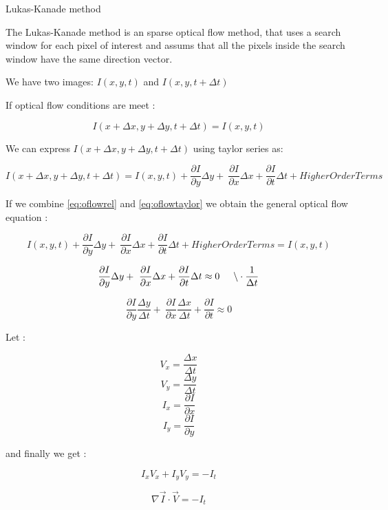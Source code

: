 Lukas-Kanade method

The Lukas-Kanade method is an sparse optical flow method, that 
uses a search window for each pixel of interest and assums that all the pixels 
inside the search window have the same direction vector.


We have two images: $I(x,y,t)$ and $I(x,y,t+\Delta t)$ 

If optical flow conditions are meet :

\begin{equation}
\label{eq:oflowrel}
I(x + \Delta x,y + \Delta y, t + \Delta t) = I(x,y,t)
\end{equation}

We can express $I(x + \Delta x, y + \Delta y, t + \Delta t)$ using taylor series as:

\begin{equation}
\label{eq:oflowtaylor}
I(x + \Delta x, y + \Delta y, t + \Delta t) = I(x,y,t) + \frac{\partial I}{\partial y} \Delta y + \
 \frac{\partial I}{\partial x} \Delta x  + \frac{\partial I}{\partial t} \Delta t + Higher Order Terms 
\end{equation}

If we combine \ref{eq:oflowrel} and \ref{eq:oflowtaylor} we obtain the general optical flow equation :


$$ I(x,y,t) + \frac{\partial I}{\partial y} \Delta y + \
 \frac{\partial I}{\partial x} \Delta x  + \frac{\partial I}{\partial t} \Delta t + Higher Order Terms = I(x,y,t) $$


$$ \frac{\partial I}{\partial y} \Delta y + \
 \frac{\partial I}{\partial x} \Delta x  + \frac{\partial I}{\partial t} \Delta t \approx 0 \hspace{0.5cm} \backslash \cdot \frac{1}{\Delta t} $$


$$ \frac{\partial I}{\partial y} \frac{\Delta y}{\Delta t} + \
 \frac{\partial I}{\partial x} \frac{\Delta x}{\Delta t}  + \frac{\partial I}{\partial t}  \approx 0 $$


Let :

$$ V_x = \frac{\Delta x}{\Delta t} $$
$$ V_y = \frac{\Delta y}{\Delta t} $$
$$ I_x = \frac{\partial I}{\partial x}$$
$$ I_y = \frac{\partial I}{\partial y}$$

and finally we get :

$$ I_x V_x + I_y V_y = -I_t $$

\begin{equation}
\label{eq:oflowgeneral}
\nabla{\vec{I}} \cdot \vec{V} = -I_t
\end{equation}



